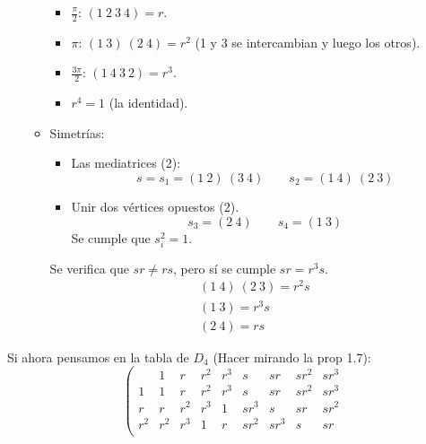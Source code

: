 \begin{ejemplo}
\begin{enumerate}
\begin{itemize}
\begin{itemize}
                        \item $\frac{\pi}{2}$: $(1\ 2\ 3\ 4)=r$.
                        \item $\pi$: $(1\ 3)\ (2\ 4)=r^2$ (1 y 3 se intercambian y luego los otros).
                        \item $\frac{3\pi}{2}$: $(1\ 4\ 3\ 2)=r^3$.
                        \item $r^4 = 1$ (la identidad).
                    \end{itemize}
                \item Simetrías:
                    \begin{itemize}
                        \item Las mediatrices (2):
                            \begin{equation*}
                                s = s_1 = (1\ 2)\ (3\ 4) \qquad s_2 = (1\ 4)\ (2\ 3)
                            \end{equation*}
                        \item Unir dos vértices opuestos (2).
                            \begin{equation*}
                                s_3 =(2\ 4) \qquad s_4 = (1\ 3)
                            \end{equation*}
                            Se cumple que $s_i^2 = 1$.
                    \end{itemize}
                    Se verifica que $sr\neq rs$, pero sí se cumple $sr = r^{3}s$.
                    \begin{gather*}
                        (1\ 4)\ (2\ 3) = r^2s \\
                        (1\ 3) = r^3 s \\
                        (2\ 4) = rs
                    \end{gather*}
            \end{itemize}
    \end{enumerate}
    Si ahora pensamos en la tabla de $D_4$ (Hacer mirando la prop 1.7):
    \begin{equation*}
        \left(\begin{array}{c|cccccccc}
             & 1 & r & r^2 & r^3 & s & sr & sr^2 & sr^3 \\
             \hline
                1 & 1 & r & r^2 & r^3 & s & sr & sr^2 & sr^3 \\
                r & r & r^2 & r^3 & 1 & sr^3 & s & sr & sr^2 \\
                r^2 & r^2 & r^3 & 1 & r & sr^2 & sr^3 & s & sr \\

\end{array}
\end{equation*}
\end{ejemplo}

